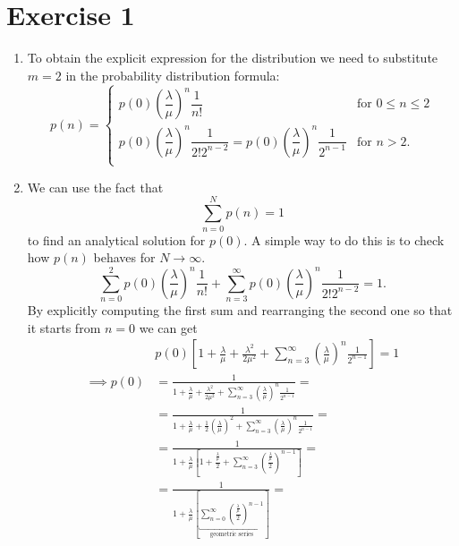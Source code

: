 \documentclass[12pt]{article}
\begin{document}
	\section*{Exercise 1}
	\begin{enumerate}
		\item To obtain the explicit expression for the distribution we need to substitute $m=2$ in the probability distribution formula:
		\begin{equation*}
			p(n)=\begin{cases}
				p(0)\left(\dfrac{\lambda}{\mu}\right)^{n}\dfrac{1}{n!}&\text{for }0\leqslant n\leqslant 2\\
				p(0)\left(\dfrac{\lambda}{\mu}\right)^{n}\dfrac{1}{2!2^{n-2}}=	p(0)\left(\dfrac{\lambda}{\mu}\right)^{n}\dfrac{1}{2^{n-1}}&\text{for }n> 2.\\
			\end{cases}
		\end{equation*}
		\item We can use the fact that 
		\[\sum_{n=0}^Np(n)=1\]
		to find an analytical solution for $p(0)$. A simple way to do this is to check how $p(n)$ behaves for $N\to\infty$. 
		\begin{equation*}
			\sum^2_{n=0}p(0)\left(\frac{\lambda}{\mu}\right)^{n}\frac{1}{n!}+\sum_{n=3}^{\infty}p(0)\left(\frac{\lambda}{\mu}\right)^{n}\frac{1}{2!2^{n-2}}=1.
		\end{equation*}
		By explicitly computing the first sum and rearranging the second one so that it starts from $n=0$ we can get
		\begin{align*}
			&p(0)\left[1+\frac{\lambda}{\mu}+\frac{\lambda^{2}}{2\mu^{2}}+\sum_{n=3}^{\infty}\left(\frac{\lambda}{\mu}\right)^{n}\frac{1}{2^{n-1}}\right]=1\\
			\implies p(0)&=\frac{1}{1+\frac{\lambda}{\mu}+\frac{\lambda^{2}}{2\mu^{2}}+\sum_{n=3}^{\infty}\left(\frac{\lambda}{\mu}\right)^{n}\frac{1}{2^{n-1}}}=\\
			&=\frac{1}{1+\frac{\lambda}{\mu}+\frac{1}{2}\left(\frac{\lambda}{\mu}\right)^{2}+\sum_{n=3}^{\infty}\left(\frac{\lambda}{\mu}\right)^{n}\frac{1}{2^{n-1}}}=\\
			&=\frac{1}{1+\frac{\lambda}{\mu}\left[1+\frac{\frac{\lambda}{\mu}}{2}+\sum_{n=3}^{\infty}\left(\frac{\frac{\lambda}{\mu}}{2}\right)^{n-1}\right]}=\\
			&=\frac{1}{1+\frac{\lambda}{\mu}\left[\underbracket{\sum_{n=0}^{\infty}\left(\frac{\frac{\lambda}{\mu}}{2}\right)^{n-1}}_{\text{geometric series}}\right]}=\\

\end{align*}
\end{enumerate}
\end{document}
